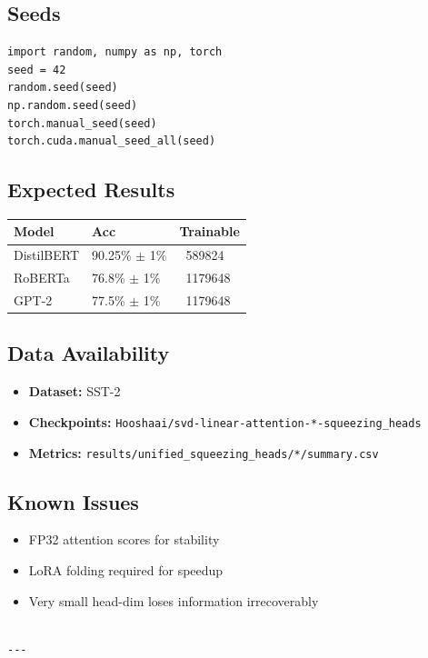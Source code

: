 \subsection{Seeds}

\begin{lstlisting}
import random, numpy as np, torch
seed = 42
random.seed(seed)
np.random.seed(seed)
torch.manual_seed(seed)
torch.cuda.manual_seed_all(seed)
\end{lstlisting}

\subsection{Expected Results}

\begin{table}[H]
\centering
\small
\begin{tabular}{lll}
\toprule
\textbf{Model} & \textbf{Acc} & \textbf{Trainable} \\
\midrule
DistilBERT & 90.25\% $\pm$ 1\% & ~589824 \\
RoBERTa & 76.8\% $\pm$ 1\% & ~1179648 \\
GPT-2 & 77.5\% $\pm$ 1\% & ~1179648 \\
\bottomrule
\end{tabular}
\end{table}

\subsection{Data Availability}

\begin{itemize}
\item \textbf{Dataset:} SST-2
\item \textbf{Checkpoints:} \texttt{Hooshaai/svd-linear-attention-*-squeezing\_heads}
\item \textbf{Metrics:} \texttt{results/unified\_squeezing\_heads/*/summary.csv}

\end{itemize}
\subsection{Known Issues}

\begin{itemize}
\item FP32 attention scores for stability
\item LoRA folding required for speedup
\item Very small head-dim loses information irrecoverably
\end{itemize}
\begin{lstlisting}

---
\end{lstlisting}